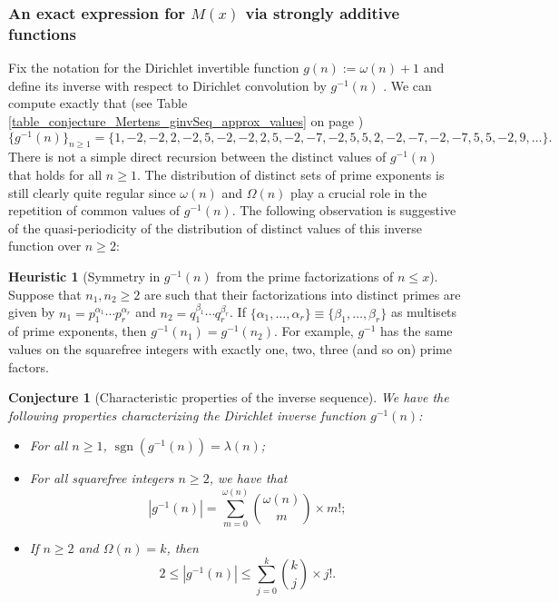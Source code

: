 \documentclass[11pt,reqno,a4letter]{article}
\numberwithin{figure}{section}
\numberwithin{table}{section}
\newcommand{\seqnum}[1]{\href{http://oeis.org/#1}{\color{ProcessBlue}{\underline{#1}}}}
\theoremstyle{plain}
\newtheorem{conjecture}[theorem]{Conjecture}
\numberwithin{theorem}{section}
\theoremstyle{definition}
\newtheorem{heuristic}[theorem]{Heuristic}
\begin{document}
\subsubsection{An exact expression for $M(x)$ via strongly additive functions} 
\label{example_InvertingARecRelForMx_Intro}

Fix the notation for the Dirichlet invertible function $g(n) := \omega(n) + 1$ and define its 
inverse with respect to Dirichlet convolution by $g^{-1}(n)$ 
\cite[\seqnum{A341444}]{OEIS}. 
We can compute exactly that 
(see Table \ref{table_conjecture_Mertens_ginvSeq_approx_values} on page 
\pageref{table_conjecture_Mertens_ginvSeq_approx_values}) 
\[
\{g^{-1}(n)\}_{n \geq 1} = \{1, -2, -2, 2, -2, 5, -2, -2, 2, 5, -2, -7, -2, 5, 5, 2, -2, -7, -2, 
     -7, 5, 5, -2, 9, \ldots \}. 
\] 
There is not a simple 
direct recursion between the distinct values of $g^{-1}(n)$ that holds for all $n \geq 1$. 
The distribution of distinct sets of prime exponents is still clearly quite regular since 
$\omega(n)$ and $\Omega(n)$ play a crucial role in the repetition of common values of 
$g^{-1}(n)$. 
The following observation is suggestive of the quasi-periodicity of the distribution of 
distinct values of this inverse function over $n \geq 2$: 

\begin{heuristic}[Symmetry in $g^{-1}(n)$ from the prime factorizations of $n \leq x$] 
\label{heuristic_SymmetryIngInvFuncs} 
Suppose that $n_1, n_2 \geq 2$ are such that their factorizations into distinct primes are 
given by $n_1 = p_1^{\alpha_1} \cdots p_r^{\alpha_r}$ and $n_2 = q_1^{\beta_1} \cdots q_r^{\beta_r}$. 
If $\{\alpha_1, \ldots, \alpha_r\} \equiv \{\beta_1, \ldots, \beta_r\}$ as multisets of prime exponents, 
then $g^{-1}(n_1) = g^{-1}(n_2)$. For example, $g^{-1}$ has the same values on the squarefree integers 
with exactly one, two, three (and so on) prime factors.  
\end{heuristic} 

\begin{conjecture}[Characteristic properties of the inverse sequence] 
\label{lemma_gInv_MxExample} 
We have the following properties characterizing the 
Dirichlet inverse function $g^{-1}(n)$: 
\begin{itemize} 

\item[\textbf{(A)}] For all $n \geq 1$, $\operatorname{sgn}(g^{-1}(n)) = \lambda(n)$; 
\item[\textbf{(B)}] For all squarefree integers $n \geq 2$, we have that 
     \[
     |g^{-1}(n)| = \sum_{m=0}^{\omega(n)} \binom{\omega(n)}{m} \times m!; 
     \]
\item[\textbf{(C)}] If $n \geq 2$ and $\Omega(n) = k$, then 
     \[
     2 \leq |g^{-1}(n)| \leq \sum_{j=0}^{k} \binom{k}{j} \times j!. 
     \]
\end{itemize} 
\end{conjecture} 
\end{document}

